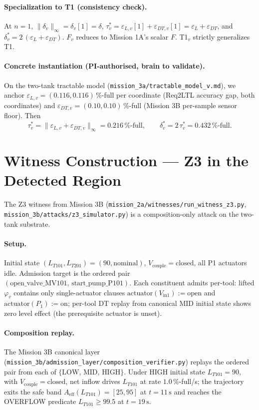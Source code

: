 \documentclass[11pt]{article}
\begin{document}
\paragraph{Specialization to T1 (consistency check).}
At $n = 1$, $\|\delta_v\|_\infty = \delta_v[1] = \delta$,
$\tau^{*}_{v} = \varepsilon_{L,v}[1] + \varepsilon_{DT,v}[1] = \varepsilon_L
+ \varepsilon_{DT}$, and $\delta^{*}_{v} = 2\,(\varepsilon_L + \varepsilon_{DT})$.
$F_v$ reduces to Mission 1A's scalar $F$. T1${}_v$ strictly generalizes T1.

\paragraph{Concrete instantiation (PI-authorised, brain to validate).}
On the two-tank tractable model (\texttt{mission\_3a/tractable\_model\_v.md}),
we anchor $\varepsilon_{L,v} = (0.116, 0.116)\,\%$-full per coordinate
(Req2LTL accuracy gap, both coordinates) and
$\varepsilon_{DT,v} = (0.10, 0.10)\,\%$-full (Mission 3B per-sample sensor floor).
Then
\[
\tau^{*}_{v} = \|\varepsilon_{L,v} + \varepsilon_{DT,v}\|_\infty
            = 0.216\,\%\text{-full},
\qquad
\delta^{*}_{v} = 2\,\tau^{*}_{v} = 0.432\,\%\text{-full}.
\]

\section{Witness Construction --- Z3 in the Detected Region}
\label{sec:z3-witness}

The Z3 witness from Mission 3B
(\texttt{mission\_2a/witnesses/run\_witness\_z3.py},
\texttt{mission\_3b/attacks/z3\_simulator.py}) is a composition-only attack
on the two-tank substrate.

\paragraph{Setup.} Initial state $(L_{T101}, L_{T201}) = (90, \text{nominal})$,
$V_{\text{couple}} = \text{closed}$, all P1 actuators idle. Admission target
is the ordered pair $(\text{open\_valve\_MV101},\,\text{start\_pump\_P101})$.
Each constituent admits per-tool: lifted $\varphi_v$ contains only single-actuator
clauses $\text{actuator}(V_{\text{in1}}) := \text{open}$ and
$\text{actuator}(P_1) := \text{on}$; per-tool DT replay from canonical MID
initial state shows zero level effect (the prerequisite actuator is unset).

\paragraph{Composition replay.} The Mission 3B canonical layer
(\texttt{mission\_3b/admission\_layer/composition\_verifier.py}) replays
the ordered pair from each of $\{\text{LOW},\,\text{MID},\,\text{HIGH}\}$.
Under HIGH initial state $L_{T101} = 90$, with $V_{\text{couple}} = \text{closed}$,
net inflow drives $L_{T101}$ at rate $1.0\,\%$-full/s; the trajectory
exits the safe band $A_{\text{eff}}(L_{T101}) = [25, 95]$ at $t = 11\,\mathrm{s}$
and reaches the OVERFLOW predicate $L_{T101} \geq 99.5$ at $t = 19\,\mathrm{s}$.
\end{document}
